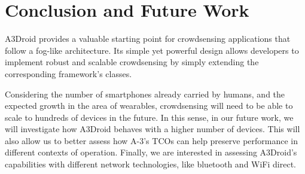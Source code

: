 \section{Conclusion and Future Work}
\label{sec:conclusion}


A3Droid provides a valuable starting point for crowdsensing applications that follow a fog-like architecture. Its simple yet powerful design allows developers to implement robust and scalable crowdsensing by simply extending the corresponding framework's classes. 



Considering the number of smartphones already carried by humans, and the expected growth in the area of wearables, crowdsensing will need to be able to scale to hundreds of devices in the future. In this sense, in our future work, we will investigate how A3Droid behaves with a higher number of devices. This will also allow us to better assess how A-3's TCOs can help preserve performance in different contexts of operation. Finally, we are interested in assessing A3Droid's capabilities with different network technologies, like bluetooth and WiFi direct.